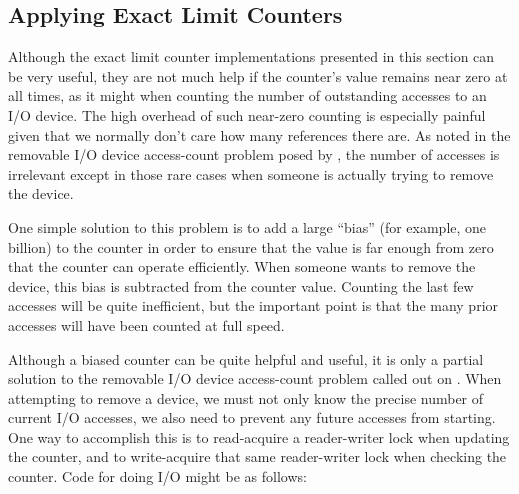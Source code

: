 \QuickQuizEnd

\subsection{Applying Exact Limit Counters}
\label{sec:count:Applying Exact Limit Counters}

Although the exact limit counter implementations presented in this
section can be very useful, they are not much help if the counter's value
remains near zero at all times, as it might when counting the number
of outstanding accesses to an I/O device.
The high overhead of such near-zero counting is especially painful
given that we normally don't care how many references there are.
As noted in the removable I/O device access-count problem posed by
\QuickQuizRef{\QcountQIOcnt},
the number of accesses is irrelevant except in those rare cases when
someone is actually trying to remove the device.

One simple solution to this problem is to add a large ``bias''
(for example, one billion) to the
counter in order to ensure that the value is far enough from zero that
the counter can operate efficiently.
When someone wants to remove the device, this bias is subtracted from
the counter value.
Counting the last few accesses will be quite inefficient,
but the important point is that the many prior accesses will have been
counted at full speed.

\QuickQuizEnd

Although a biased counter can be quite helpful and useful, it is only a
partial solution to the removable I/O device access-count problem
called out on
.
When attempting to remove a device, we must not only know the precise
number of current I/O accesses, we also need to prevent any future
accesses from starting.
One way to accomplish this is to read-acquire a reader-writer lock
when updating the counter, and to write-acquire that same reader-writer
lock when checking the counter.
Code for doing I/O might be as follows:

